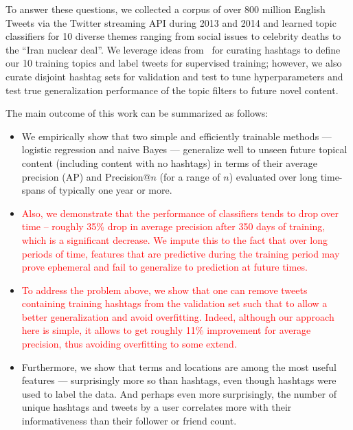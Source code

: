 To answer these questions, we collected a corpus of over 800 million English Tweets via the Twitter streaming API during 2013 and 2014 and learned topic classifiers for 10 diverse themes ranging from social issues to celebrity deaths to the ``Iran nuclear deal''.  We leverage ideas from~\cite{lin2011smoothing} for curating hashtags to define our 10 training topics and label tweets for supervised training; however, we also curate disjoint hashtag sets for validation and test to tune hyperparameters and test true generalization performance of the topic filters to future novel content. 

The main outcome of this work can be summarized as follows:
\begin{itemize}
    \item We empirically show that two simple and efficiently trainable methods ---
logistic regression and naive Bayes --- generalize well to unseen
future topical content (including content with no hashtags) in terms
of their average precision (AP) and Precision@$n$ (for a range of
$n$) evaluated over long time-spans of typically one year or more.
\item \textcolor{red}{Also, we demonstrate that the performance of classifiers tends to drop over time -- roughly 35\% drop in average precision after 350 days of training, which is a significant decrease. We impute this to the fact that over long periods of time, features that are predictive during the training period may prove ephemeral and fail to generalize to prediction at future times. }
\item \textcolor{red}{To address the problem above, we show that one can remove tweets containing training hashtags from the validation set such that to allow a better generalization and avoid overfitting. Indeed, although our approach here is simple, it allows to get roughly 11\% improvement for average precision, thus avoiding overfitting to some extend.}
    \item Furthermore, we show that terms and locations are among the most
useful features --- surprisingly more so than hashtags, even though
hashtags were used to label the data.  And perhaps even more
surprisingly, the number of unique hashtags and tweets by a user
correlates more with their informativeness than their follower or
friend count.  
\end{itemize}
  


